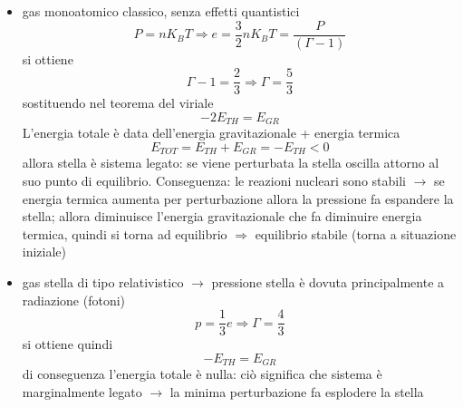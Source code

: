 \begin{itemize}
    \item gas monoatomico classico, senza effetti quantistici
    \begin{equation*}
        P = n K_B T \Rightarrow e = \frac{3}{2}n K_B T = \frac{P}{(\Gamma - 1)}
    \end{equation*}
    si ottiene
    \begin{equation*}
        \Gamma - 1 = \frac{2}{3} \Rightarrow \Gamma = \frac{5}{3}
    \end{equation*}
    sostituendo nel teorema del viriale
    \begin{equation*}
        -2 E_{TH} = E_{GR}
    \end{equation*}
    L'energia totale è data dell'energia gravitazionale + energia termica
    \begin{equation*}
        E_{TOT} = E_{TH} + E_{GR} = -E_{TH} < 0
    \end{equation*}
    allora stella è sistema legato: se viene perturbata la stella oscilla attorno al suo punto di equilibrio. Conseguenza: le reazioni nucleari sono stabili $\rightarrow$ se energia termica aumenta per perturbazione allora la pressione fa espandere la stella; allora diminuisce l'energia gravitazionale che fa diminuire energia termica, quindi si torna ad equilibrio $\Rightarrow$ equilibrio stabile (torna a situazione iniziale)
    \item gas stella di tipo relativistico $\rightarrow$ pressione stella è dovuta principalmente a radiazione (fotoni)
    \begin{equation*}
        p = \frac{1}{3} e \Rightarrow \Gamma = \frac{4}{3}
    \end{equation*}
    si ottiene quindi 
    \begin{equation*}
        -E_{TH} = E_{GR}
    \end{equation*}
    di conseguenza l'energia totale è nulla: ciò significa che sistema è marginalmente legato $\rightarrow$ la minima perturbazione fa esplodere la stella
\end{itemize}